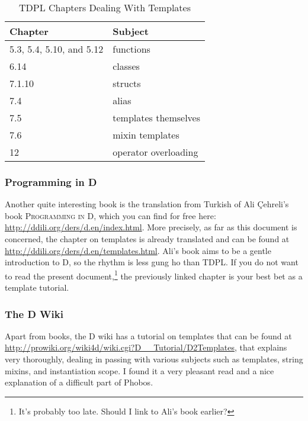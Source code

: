 \begin{table}[htb]
\centering
\begin{tabular}[c]{|l|l|}
\hline
Chapter                  & Subject         \\ \hline \hline
5.3, 5.4, 5.10, and 5.12 & functions \\ \hline
6.14                     & classes \\ \hline
7.1.10                   & structs \\ \hline
7.4                      & alias \\ \hline
7.5                      & templates themselves \\ \hline
7.6                      & mixin templates \\ \hline
12                       & operator overloading  \\ \hline
\end{tabular}
\caption{TDPL Chapters Dealing With Templates}
\label{table:tdplchapters}
\end{table}

\subsubsection{Programming in D}

Another quite interesting book is the translation from Turkish of Ali \c{C}ehreli's book \textsc{Programming in D}, which you can find for free here: \url{http://ddili.org/ders/d.en/index.html}. More precisely, as far as this document is concerned, the chapter on templates is already translated and can be found at \url{http://ddili.org/ders/d.en/templates.html}. Ali's book aims to be a gentle introduction to D, so the rhythm is less gung ho than TDPL. If you do not want to read the present document,\footnote{ It's probably too late. Should I link to Ali's book earlier?} the previously linked chapter is your best bet as a template tutorial.

\subsubsection{The D Wiki}

Apart from books, the D wiki has a tutorial on templates that can be found at \url{http://prowiki.org/wiki4d/wiki.cgi?D__Tutorial/D2Templates}, that explains  very thoroughly, dealing in passing with various subjects such as templates, string mixins, and instantiation scope. I found it a very pleasant read and a nice explanation of a difficult part of Phobos.

